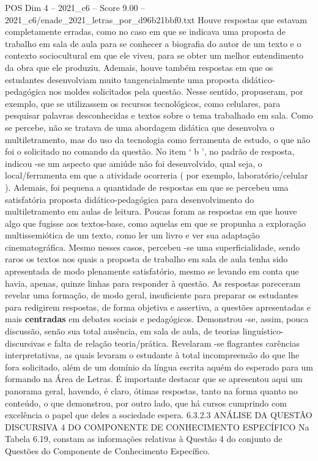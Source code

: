 \begin{textsample}{POS Dim 4 – 2021\_c6 – Score 9.00 – 2021\_c6/enade\_2021\_letras\_por\_d96b21bbf0.txt}
Houve respostas que estavam completamente erradas, como no caso em que se indicava uma proposta de trabalho em sala de aula para se conhecer a biografia do autor de um texto e o contexto sociocultural em que ele viveu, para se obter um melhor entendimento da obra que ele produziu.
Ademais, houve também respostas em que os estudantes desenvolviam muito tangencialmente uma proposta didático-pedagógica nos moldes solicitados pela questão.
Nesse sentido, propuseram, por exemplo, que se utilizassem os recursos tecnológicos, como celulares, para pesquisar palavras desconhecidas e textos sobre o tema trabalhado em sala.
Como se percebe, não se tratava de uma abordagem didática que desenvolva o multiletramento, mas do uso da tecnologia como ferramenta de estudo, o que não foi o solicitado no comando da questão.
No item ‘ b ’, no padrão de resposta, indicou -se um aspecto que amiúde não foi desenvolvido, qual seja, o local/ferramenta em que a atividade ocorreria ( por exemplo, laboratório/celular ).
Ademais, foi pequena a quantidade de respostas em que se percebeu uma satisfatória proposta didático-pedagógica para desenvolvimento do multiletramento em aulas de leitura.
Poucas foram as respostas em que houve algo que fugisse aos textos-base, como aquelas em que se propunha a exploração multissemiótica de um texto, como ler um livro e ver sua adaptação cinematográfica.
Mesmo nesses casos, percebeu -se uma superficialidade, sendo raros os textos nos quais a proposta de trabalho em sala de aula tenha sido apresentada de modo plenamente satisfatório, mesmo se levando em conta que havia, apenas, quinze linhas para responder à questão.
As respostas pareceram revelar uma formação, de modo geral, insuficiente para preparar os estudantes para redigirem respostas, de forma objetiva e assertiva, a questões apresentadas e mais \textbf{centradas} em debates sociais e pedagógicos.
Demonstrou -se, assim, pouca discussão, senão sua total ausência, em sala de aula, de teorias linguístico-discursivas e falta de relação teoria/prática.
Revelaram -se flagrantes carências interpretativas, as quais levaram o estudante à total incompreensão do que lhe fora solicitado, além de um domínio da língua escrita aquém do esperado para um formando na Área de Letras.
É importante destacar que se apresentou aqui um panorama geral, havendo, é claro, ótimas respostas, tanto na forma quanto no conteúdo, o que demonstrou, por outro lado, que há cursos cumprindo com excelência o papel que deles a sociedade espera. 6.3.2.3 ANÁLISE DA QUESTÃO DISCURSIVA 4 DO COMPONENTE DE CONHECIMENTO ESPECÍFICO Na Tabela 6.19, constam as informações relativas à Questão 4 do conjunto de Questões do Componente de Conhecimento Específico.

\end{textsample}
